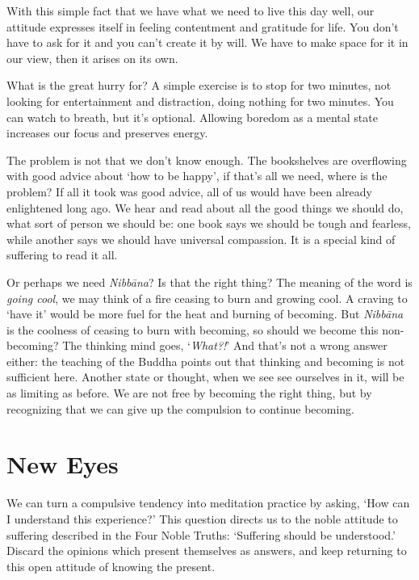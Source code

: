 With this simple fact that we have what we need to live this day well,
our attitude expresses itself in feeling contentment and gratitude for
life. You don't have to ask for it and you can't create it by will. We
have to make space for it in our view, then it arises on its own.

What is the great hurry for? A simple exercise is to stop for two
minutes, not looking for entertainment and distraction, doing nothing
for two minutes. You can watch to breath, but it's optional. Allowing
boredom as a mental state increases our focus and preserves energy.

The problem is not that we don't know enough. The bookshelves are
overflowing with good advice about `how to be happy', if that's all we
need, where is the problem? If all it took was good advice, all of us
would have been already enlightened long ago. We hear and read about all
the good things we should do, what sort of person we should be: one book
says we should be tough and fearless, while another says we should have
universal compassion. It is a special kind of suffering to read it all.

Or perhaps we need \emph{Nibbāna}? Is that the right thing? The meaning
of the word is \emph{going cool}, we may think of a fire ceasing to burn
and growing cool. A craving to `have it' would be more fuel for the heat
and burning of becoming. But \emph{Nibbāna} is the coolness of ceasing
to burn with becoming, so should we become this non-becoming? The
thinking mind goes, `\emph{What?!}' And that's not a wrong answer
either: the teaching of the Buddha points out that thinking and becoming
is not sufficient here. Another state or thought, when we see see
ourselves in it, will be as limiting as before. We are not free by
becoming the right thing, but by recognizing that we can give up the
compulsion to continue becoming.

\section{New Eyes}


We can turn a compulsive tendency into meditation practice by asking,
`How can I understand this experience?' This question directs us to the
noble attitude to suffering described in the Four Noble Truths:
`Suffering should be understood.' Discard the opinions which present
themselves as answers, and keep returning to this open attitude of
knowing the present.

